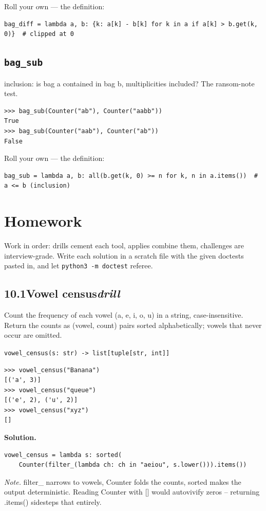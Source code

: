 \documentclass[10pt,letterpaper]{book}
\begin{document}
Roll your own --- the definition:

\begin{lstlisting}[style=ex]
bag_diff = lambda a, b: {k: a[k] - b[k] for k in a if a[k] > b.get(k, 0)}  # clipped at 0
\end{lstlisting}
\subsection{\texttt{bag\_sub}}\label{def:bag-sub}
inclusion: is bag a contained in bag b, multiplicities included? The ransom-note test.
\begin{lstlisting}[style=ex]
>>> bag_sub(Counter("ab"), Counter("aabb"))
True
>>> bag_sub(Counter("aab"), Counter("ab"))
False
\end{lstlisting}

Roll your own --- the definition:

\begin{lstlisting}[style=ex]
bag_sub = lambda a, b: all(b.get(k, 0) >= n for k, n in a.items())  # a <= b (inclusion)
\end{lstlisting}
\section{Homework}
Work in order: drills cement each tool, applies combine them,
challenges are interview-grade. Write each solution in a scratch file with
the given doctests pasted in, and let \texttt{python3 -m doctest} referee.
\subsection*{10.1\quad Vowel census\hfill\textnormal{\textit{drill}}}
Count the frequency of each vowel (a, e, i, o, u) in a string, case-insensitive. Return the counts as (vowel, count) pairs sorted alphabetically; vowels that never occur are omitted.

\noindent\texttt{vowel\_census(s: str) -> list[tuple[str, int]]}
\begin{lstlisting}[style=ex]
>>> vowel_census("Banana")
[('a', 3)]
>>> vowel_census("queue")
[('e', 2), ('u', 2)]
>>> vowel_census("xyz")
[]
\end{lstlisting}
\noindent\textbf{Solution.}
\begin{lstlisting}[style=code]
vowel_census = lambda s: sorted(
    Counter(filter_(lambda ch: ch in "aeiou", s.lower())).items())
\end{lstlisting}
\noindent\textit{Note.} filter\_ narrows to vowels, Counter folds the counts, sorted makes the output deterministic. Reading Counter with [] would autovivify zeros -- returning .items() sidesteps that entirely.
\end{document}
